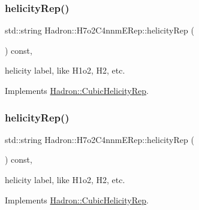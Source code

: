 \mbox{\label{structHadron_1_1H7o2C4nnmERep_ab9cdc1b5f216f5ac06995e9405037509}} 
\subsubsection{\texorpdfstring{helicityRep()}{helicityRep()}\hspace{0.1cm}{\footnotesize\ttfamily [1/3]}}
{\footnotesize\ttfamily std\+::string Hadron\+::\+H7o2\+C4nnm\+E\+Rep\+::helicity\+Rep (\begin{DoxyParamCaption}{ }\end{DoxyParamCaption}) const\hspace{0.3cm}{\ttfamily [inline]}, {\ttfamily [virtual]}}

helicity label, like H1o2, H2, etc. 

Implements \mbox{\hyperlink{structHadron_1_1CubicHelicityRep_af1096946b7470edf0a55451cc662f231}{Hadron\+::\+Cubic\+Helicity\+Rep}}.

\mbox{\label{structHadron_1_1H7o2C4nnmERep_ab9cdc1b5f216f5ac06995e9405037509}} 
\subsubsection{\texorpdfstring{helicityRep()}{helicityRep()}\hspace{0.1cm}{\footnotesize\ttfamily [2/3]}}
{\footnotesize\ttfamily std\+::string Hadron\+::\+H7o2\+C4nnm\+E\+Rep\+::helicity\+Rep (\begin{DoxyParamCaption}{ }\end{DoxyParamCaption}) const\hspace{0.3cm}{\ttfamily [inline]}, {\ttfamily [virtual]}}

helicity label, like H1o2, H2, etc. 

Implements \mbox{\hyperlink{structHadron_1_1CubicHelicityRep_af1096946b7470edf0a55451cc662f231}{Hadron\+::\+Cubic\+Helicity\+Rep}}.

\mbox{\label{structHadron_1_1H7o2C4nnmERep_ab9cdc1b5f216f5ac06995e9405037509}} 
